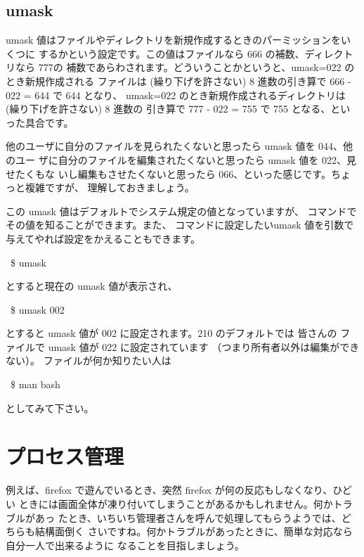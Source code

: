 \documentclass[platex]{jsarticle}
\begin{document}
 \subsection{umask}
 umask 値はファイルやディレクトリを新規作成するときのパーミッションをいくつに
 するかという設定です。この値はファイルなら 666 の補数、ディレクトリなら 777の
 補数であらわされます。どういうことかというと、umask=022 のとき新規作成される
 ファイルは (繰り下げを許さない) 8 進数の引き算で 666 - 022 = 644 で 644 となり、
 umask=022 のとき新規作成されるディレクトリは (繰り下げを許さない) 8 進数の
 引き算で 777 - 022 = 755 で 755 となる、といった具合です。

 他のユーザに自分のファイルを見られたくないと思ったら umask 値を 044、他のユー
 ザに自分のファイルを編集されたくないと思ったら umask 値を 022、見せたくもな
 いし編集もさせたくないと思ったら 066、といった感じです。ちょっと複雑ですが、
 理解しておきましょう。

 この umask 値はデフォルトでシステム規定の値となっていますが、
  コマンドでその値を知ることができます。また、
 コマンドに設定したいumask 値を引数で与えてやれば設定をかえることもできます。
 \begin{terminal}~\$ umask\end{terminal}
 とすると現在の umask 値が表示され、
 \begin{terminal}~\$ umask 002\end{terminal}
 とすると umask 値が 002 に設定されます。210 のデフォルトでは
 皆さんの  ファイルで umask 値が 022 に設定されています
 （つまり所有者以外は編集ができない）。
  ファイルが何か知りたい人は
 \begin{terminal}~\$ man bash\end{terminal}
 としてみて下さい。



%


\section{プロセス管理}

 例えば、firefox で遊んでいるとき、突然 firefox が何の反応もしなくなり、ひどい
 ときには画面全体が凍り付いてしまうことがあるかもしれません。何かトラブルがあっ
 たとき、いちいち管理者さんを呼んで処理してもらうようでは、どちらも結構面倒く
 さいですね。何かトラブルがあったときに、簡単な対応なら自分一人で出来るように
 なることを目指しましょう。
\end{document}
